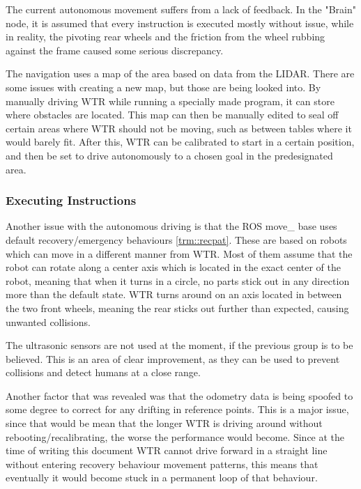 The current autonomous movement suffers from a lack of feedback.
In the "Brain" node, it is assumed that every instruction is executed mostly without issue, while in reality, the pivoting rear wheels and the friction from the wheel rubbing against the frame caused some serious discrepancy.

The navigation uses a map of the area based on data from the LIDAR.
There are some issues with creating a new map, but those are being looked into.
By manually driving WTR while running a specially made program, it can store where obstacles are located.
This map can then be manually edited to seal off certain areas where WTR should not be moving, such as between tables where it would barely fit.
After this, WTR can be calibrated to start in a certain position, and then be set to drive autonomously to a chosen goal in the predesignated area.

\subsubsection{Executing Instructions}
Another issue with the autonomous driving is that the ROS move\_ base uses default recovery/emergency behaviours \ref{trm::recpat}.
These are based on robots which can move in a different manner from WTR.
Most of them assume that the robot can rotate along a center axis which is located in the exact center of the robot, meaning that when it turns in a circle, no parts stick out in any direction more than the default state.
WTR turns around on an axis located in between the two front wheels, meaning the rear sticks out further than expected, causing unwanted collisions.

The ultrasonic sensors are not used at the moment, if the previous group is to be believed.
This is an area of clear improvement, as they can be used to prevent collisions and detect humans at a close range.

Another factor that was revealed was that the odometry data is being spoofed to some degree to correct for any drifting in reference points.
This is a major issue, since that would be mean that the longer WTR is driving around without rebooting/recalibrating, the worse the performance would become.
Since at the time of writing this document WTR cannot drive forward in a straight line without entering recovery behaviour movement patterns, this means that eventually it would become stuck in a permanent loop of that behaviour.



\newpage
